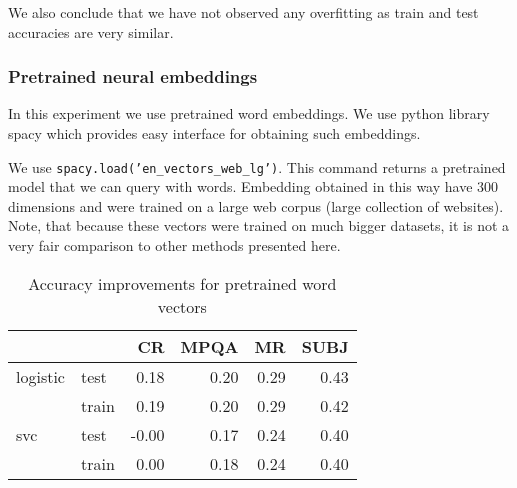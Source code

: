     We also conclude that we have not observed any overfitting as train and test accuracies are very similar.
    

    \subsubsection{Pretrained neural embeddings}    
    
    In this experiment we use pretrained word embeddings. 
    We use python library spacy which provides easy interface for obtaining such embeddings.
    
    We use \texttt{spacy.load('en\_vectors\_web\_lg')}.
    This command returns a pretrained model that we can query with words. 
    Embedding obtained in this way have $300$ dimensions and were trained on a large web corpus (large collection of websites). 
    Note, that because these vectors were trained on much bigger datasets, it is not a very fair comparison to other methods presented here.

    \begin{table}[h]
    \begin{center}
    
    \begin{tabular}{llrrrr}
    \toprule
     &&CR &MPQA &MR &SUBJ \\
    \midrule
    logistic & test & 0.18 & 0.20 & 0.29 & 0.43 \\
     & train & 0.19 & 0.20 & 0.29 & 0.42 \\
    svc & test &-0.00 & 0.17 & 0.24 & 0.40 \\
     & train & 0.00 & 0.18 & 0.24 & 0.40 \\
    \bottomrule
    \end{tabular}
    
    \caption[Accuracy improvements for pretrained word vectors]{Accuracy improvements for pretrained word vectors}
    \label{tab:res:pretrainedwordvec}
    \end{center}
    \end{table}
    
    
    
